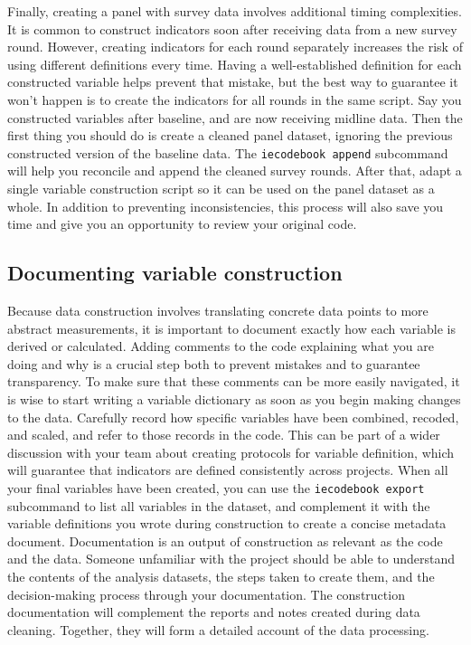 Finally, creating a panel with survey data involves additional timing complexities.
It is common to construct indicators soon after receiving data from a new survey round.
However, creating indicators for each round separately increases the risk of using different definitions every time.
Having a well-established definition for each constructed variable helps prevent that mistake,
but the best way to guarantee it won't happen is to create the indicators for all rounds in the same script.
Say you constructed variables after baseline, and are now receiving midline data.
Then the first thing you should do is create a cleaned panel dataset,
ignoring the previous constructed version of the baseline data.
The \texttt{iecodebook append} subcommand will help you reconcile and append the cleaned survey rounds.
After that, adapt a single variable construction script so it can be used on the panel dataset as a whole.
In addition to preventing inconsistencies,
this process will also save you time and give you an opportunity to review your original code.


\subsection{Documenting variable construction}

Because data construction involves translating concrete data points to more abstract measurements,
it is important to document exactly how each variable is derived or calculated.
Adding comments to the code explaining what you are doing and why is a crucial step both to prevent mistakes and to guarantee transparency.
To make sure that these comments can be more easily navigated,
it is wise to start writing a variable dictionary as soon as you begin making changes to the data.
Carefully record how specific variables have been combined, recoded, and scaled,
and refer to those records in the code.
This can be part of a wider discussion with your team about creating protocols for variable definition,
which will guarantee that indicators are defined consistently across projects.
When all your final variables have been created,
you can use the \texttt{iecodebook export} subcommand to list all variables in the dataset,
and complement it with the variable definitions you wrote during construction to create a concise metadata document.
Documentation is an output of construction as relevant as the code and the data.
Someone unfamiliar with the project should be able to understand the contents of the analysis datasets,
the steps taken to create them,
and the decision-making process through your documentation.
The construction documentation will complement the reports and notes created during data cleaning.
Together, they will form a detailed account of the data processing.

